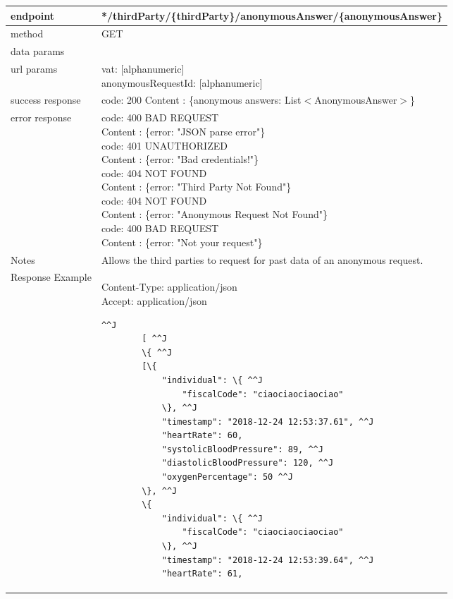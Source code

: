 	\begin{tabularx}{\linewidth}{| l| l }
		\hline
		endpoint & */thirdParty/\{thirdParty\}/anonymousAnswer/\{anonymousAnswer\} \\
		\hline
		method & GET \\
		\hline
		data params & \\
		\hline
		url params &
		\parbox{0.7\textwidth}{
			\bigskip
			vat: [alphanumeric]\\
			anonymousRequestId: [alphanumeric]
			\bigskip
		} \\
		\hline
		success response &
		\parbox{0.7\textwidth}{
			\bigskip
			code: 200\\
			Content : \{anonymous answers: List$<$AnonymousAnswer$>$\}
			\bigskip
		} \\
		\hline
		error response &
		\parbox{0.7\textwidth}{
			\bigskip
			code: 400 BAD REQUEST \\
			Content : \{error: "JSON parse error"\}\\
			code: 401 UNAUTHORIZED \\
			Content : \{error: "Bad credentials!"\}\\
			code: 404 NOT FOUND \\
			Content : \{error: "Third Party Not Found"\}\\
			code: 404 NOT FOUND \\
			Content : \{error: "Anonymous Request Not Found"\}\\
			code: 400 BAD REQUEST \\
			Content : \{error: "Not your request"\}\\
			\bigskip
		} \\
		\hline
		Notes & 
		\parbox{0.7\textwidth}{
			\bigskip Allows the third parties to request for past data of an anonymous request.
		\bigskip}  \\
		\hline
		Response Example & 
		\parbox{0.8\textwidth}{
		\bigskip
		Content-Type: application/json \\
		Accept: application/json \\
		\bigskip
		\begin{lstlisting}^^J
		[ ^^J
		\{ ^^J
		[\{
			"individual": \{ ^^J
				"fiscalCode": "ciaociaociaociao"
			\}, ^^J
			"timestamp": "2018-12-24 12:53:37.61", ^^J
			"heartRate": 60,
			"systolicBloodPressure": 89, ^^J
			"diastolicBloodPressure": 120, ^^J
			"oxygenPercentage": 50 ^^J
		\}, ^^J
		\{
			"individual": \{ ^^J
				"fiscalCode": "ciaociaociaociao"
			\}, ^^J
			"timestamp": "2018-12-24 12:53:39.64", ^^J
			"heartRate": 61,

\end{lstlisting}}
\end{tabularx}
